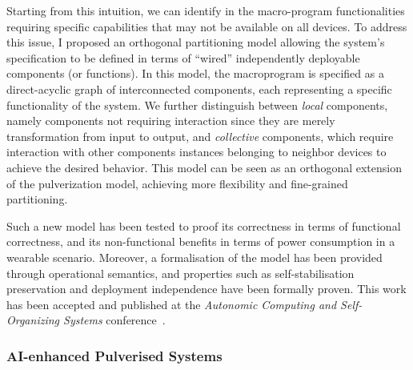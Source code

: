 \documentclass[runningheads]{llncs}
\begin{document}
Starting from this intuition,
we can identify in the macro-program functionalities requiring specific capabilities that may not be available on all devices.
%
To address this issue,
I proposed an orthogonal partitioning model allowing the system's specification to be defined in terms of ``wired'' independently deployable components (or functions).
%
In this model,
the macroprogram is specified as a direct-acyclic graph of interconnected components,
each representing a specific functionality of the system.
%
We further distinguish between \emph{local} components,
namely components not requiring interaction since they are merely transformation from input to output,
and \emph{collective} components,
which require interaction with other components instances belonging to neighbor devices to achieve the desired behavior.
%
This model can be seen as an orthogonal extension of the pulverization model,
achieving more flexibility and fine-grained partitioning.

Such a new model has been tested to proof its correctness in terms of functional correctness,
and its non-functional benefits in terms of power consumption in a wearable scenario.
Moreover,
a formalisation of the model has been provided through operational semantics,
and properties such as self-stabilisation preservation and deployment independence have been formally proven.
%
This work has been accepted and published at the \emph{Autonomic Computing and Self-Organizing Systems} conference~\cite{DBLP:conf/acsos/FarabegoliVC24}.

\subsubsection{AI-enhanced Pulverised Systems}

\end{document}
